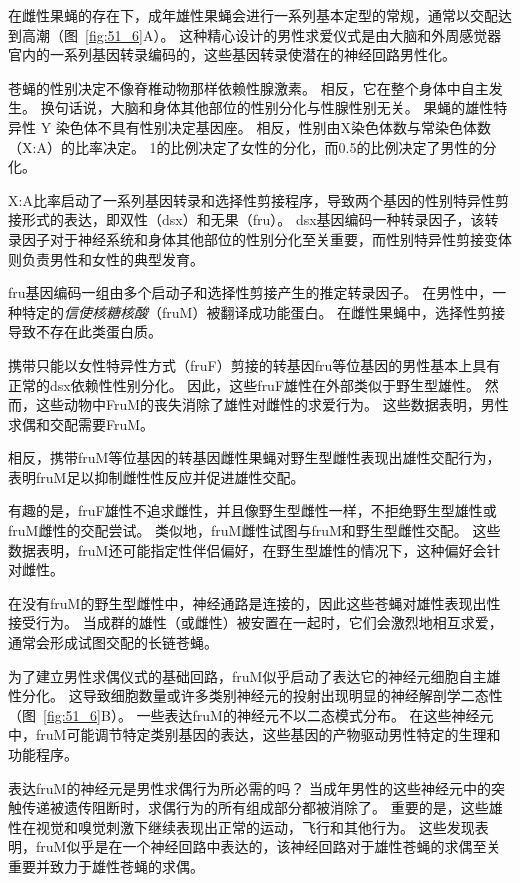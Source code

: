 \begin{proposition}[果蝇交配行为的遗传和神经控制] \label{box:51_1}
	
	\quad \quad 在雌性果蝇的存在下，成年雄性果蝇会进行一系列基本定型的常规，通常以交配达到高潮（图~\ref{fig:51_6}A）。
	这种精心设计的男性求爱仪式是由大脑和外周感觉器官内的一系列基因转录编码的，这些基因转录使潜在的神经回路男性化。
	
	\quad \quad 苍蝇的性别决定不像脊椎动物那样依赖性腺激素。
	相反，它在整个身体中自主发生。
	换句话说，大脑和身体其他部位的性别分化与性腺性别无关。
	果蝇的雄性特异性 Y 染色体不具有性别决定基因座。
	相反，性别由X染色体数与常染色体数（X:A）的比率决定。
	1的比例决定了女性的分化，而0.5的比例决定了男性的分化。
	
	\quad \quad X:A比率启动了一系列基因转录和选择性剪接程序，导致两个基因的性别特异性剪接形式的表达，即双性（dsx）和无果（fru）。
	dsx基因编码一种转录因子，该转录因子对于神经系统和身体其他部位的性别分化至关重要，而性别特异性剪接变体则负责男性和女性的典型发育。
	
	\quad \quad fru基因编码一组由多个启动子和选择性剪接产生的推定转录因子。
	在男性中，一种特定的\textit{信使核糖核酸}（fruM）被翻译成功能蛋白。
	在雌性果蝇中，选择性剪接导致不存在此类蛋白质。
	
	\quad \quad 携带只能以女性特异性方式（fruF）剪接的转基因fru等位基因的男性基本上具有正常的dsx依赖性性别分化。
	因此，这些fruF雄性在外部类似于野生型雄性。
	然而，这些动物中FruM的丧失消除了雄性对雌性的求爱行为。
	这些数据表明，男性求偶和交配需要FruM。
	
	\quad \quad 相反，携带fruM等位基因的转基因雌性果蝇对野生型雌性表现出雄性交配行为，表明fruM足以抑制雌性性反应并促进雄性交配。
	
	\quad \quad 有趣的是，fruF雄性不追求雌性，并且像野生型雌性一样，不拒绝野生型雄性或fruM雌性的交配尝试。
	类似地，fruM雌性试图与fruM和野生型雌性交配。
	这些数据表明，fruM还可能指定性伴侣偏好，在野生型雄性的情况下，这种偏好会针对雌性。
	
	\quad \quad 在没有fruM的野生型雌性中，神经通路是连接的，因此这些苍蝇对雄性表现出性接受行为。
	当成群的雄性（或雌性）被安置在一起时，它们会激烈地相互求爱，通常会形成试图交配的长链苍蝇。
	
	\quad \quad 为了建立男性求偶仪式的基础回路，fruM似乎启动了表达它的神经元细胞自主雄性分化。
	这导致细胞数量或许多类别神经元的投射出现明显的神经解剖学二态性（图~\ref{fig:51_6}B）。
	一些表达fruM的神经元不以二态模式分布。
	在这些神经元中，fruM可能调节特定类别基因的表达，这些基因的产物驱动男性特定的生理和功能程序。
	
	\quad \quad 表达fruM的神经元是男性求偶行为所必需的吗？
	当成年男性的这些神经元中的突触传递被遗传阻断时，求偶行为的所有组成部分都被消除了。
	重要的是，这些雄性在视觉和嗅觉刺激下继续表现出正常的运动，飞行和其他行为。
	这些发现表明，fruM似乎是在一个神经回路中表达的，该神经回路对于雄性苍蝇的求偶至关重要并致力于雄性苍蝇的求偶。
	
\end{proposition}




